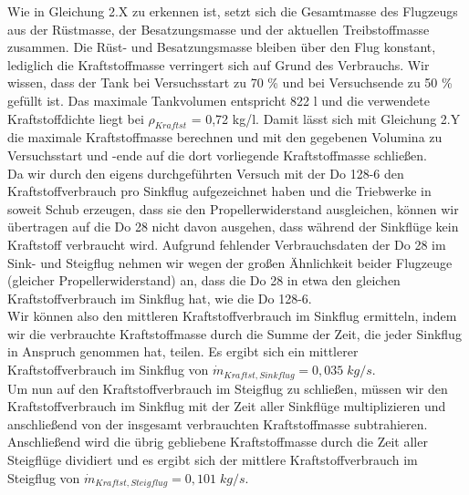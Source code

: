 Wie in Gleichung 2.X zu erkennen ist, setzt sich die Gesamtmasse des Flugzeugs aus der Rüstmasse, der Besatzungsmasse und der aktuellen Treibstoffmasse zusammen. Die Rüst- und Besatzungsmasse bleiben über den Flug konstant, lediglich die Kraftstoffmasse verringert sich auf Grund des Verbrauchs. Wir wissen, dass der Tank bei Versuchsstart zu 70 \% und bei Versuchsende zu 50 \% gefüllt ist. Das maximale Tankvolumen entspricht 822 {l} und die verwendete Kraftstoffdichte liegt bei $\rho_{Kraftst}$ = 0,72 {kg/l}. Damit lässt sich mit Gleichung 2.Y die maximale Kraftstoffmasse berechnen und mit den gegebenen Volumina zu Versuchsstart und -ende auf die dort vorliegende Kraftstoffmasse schließen.
\\
Da wir durch den eigens durchgeführten Versuch mit der Do 128-6 den Kraftstoffverbrauch pro Sinkflug aufgezeichnet haben und die Triebwerke in soweit Schub erzeugen, dass sie den Propellerwiderstand ausgleichen, können wir übertragen auf die Do 28 nicht davon ausgehen, dass während der Sinkflüge kein Kraftstoff verbraucht wird. Aufgrund fehlender Verbrauchsdaten der Do 28 im Sink- und Steigflug nehmen wir wegen der großen Ähnlichkeit beider Flugzeuge (gleicher Propellerwiderstand) an, dass die Do 28 in etwa den gleichen Kraftstoffverbrauch im Sinkflug hat, wie die Do 128-6.
\\
Wir können also den mittleren Kraftstoffverbrauch im Sinkflug ermitteln, indem wir die verbrauchte Kraftstoffmasse durch die Summe der Zeit, die jeder Sinkflug in Anspruch genommen hat, teilen. Es ergibt sich ein mittlerer Kraftstoffverbrauch im Sinkflug von $\dot{m}_{Kraftst,Sinkflug} = 0,035 \; {kg/s}$.
\\
Um nun auf den Kraftstoffverbrauch im Steigflug zu schließen, müssen wir den Kraftstoffverbrauch im Sinkflug mit der Zeit aller Sinkflüge multiplizieren und anschließend von der insgesamt verbrauchten Kraftstoffmasse subtrahieren. Anschließend wird die übrig gebliebene Kraftstoffmasse durch die Zeit aller Steigflüge dividiert und es ergibt sich der mittlere Kraftstoffverbrauch im Steigflug von $\dot{m}_{Kraftst,Steigflug} = 0,101 \; {kg/s}$.


\newpage